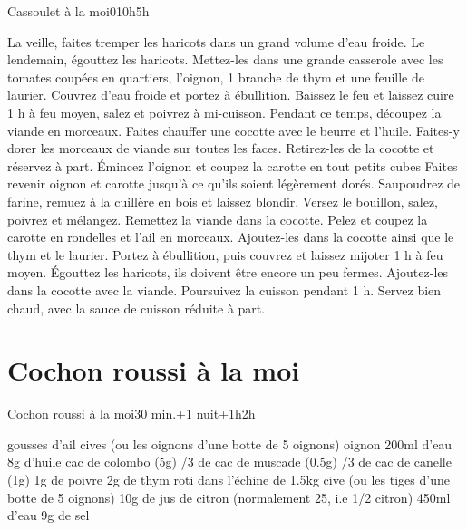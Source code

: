 {\begin{recette}{Cassoulet à la moi}{0}{10h}{5h}
\begin{preparation}
\etape La veille, faites tremper les haricots dans un grand volume d'eau froide.
\etape Le lendemain, égouttez les haricots. Mettez-les dans une grande casserole avec les tomates coupées en quartiers, 
l'oignon, 1 branche de thym et une feuille de laurier. Couvrez d'eau froide et portez à ébullition.
\etape Baissez le feu et laissez cuire 1 h à feu moyen, salez et poivrez à mi-cuisson.
\etape Pendant ce temps, découpez la viande en morceaux. Faites chauffer une cocotte avec le beurre et l'huile. Faites-y dorer 
les morceaux de viande sur toutes les faces.
\etape Retirez-les de la cocotte et réservez à part.
\etape Émincez l'oignon et coupez la carotte en tout petits cubes
\etape Faites revenir oignon et carotte jusqu'à ce qu'ils soient légèrement dorés. 
\etape Saupoudrez de farine, remuez à la cuillère en bois et laissez blondir.
\etape Versez le bouillon, salez, poivrez et mélangez. Remettez la viande dans la cocotte.
\etape Pelez et coupez la carotte en rondelles et l'ail en morceaux. Ajoutez-les dans la cocotte ainsi que le thym et le 
laurier. Portez à ébullition, puis couvrez et laissez mijoter 1 h à feu moyen.
\etape Égouttez les haricots, ils doivent être encore un peu fermes. Ajoutez-les dans la cocotte avec la viande.
\etape Poursuivez la cuisson pendant 1 h.
\etape Servez bien chaud, avec la sauce de cuisson réduite à part.
\end{preparation}
\end{recette}

\section{Cochon roussi à la moi}
\begin{recette}{Cochon roussi à la moi}{}{30 min.+1 nuit+1h}{2h}
\begin{ingredients}
\ingredient[Marinade]
 gousses d'ail
\ingredient cives (ou les oignons d'une botte de 5 oignons)
 oignon
\ingredient 200ml d'eau
\ingredient 8g d'huile
 cac de colombo (5g)
/3 de cac de muscade (0.5g)
/3 de cac de canelle (1g)
\ingredient 1g de poivre
\ingredient 2g de thym
\ingredient[cuisson]
 roti dans l'échine de 1.5kg
 cive (ou les tiges d'une botte de 5 oignons)
\ingredient 10g de jus de citron (normalement 25, i.e 1/2 citron)
\ingredient 450ml d'eau
\ingredient 9g de sel
\end{ingredients}


\end{recette}}
